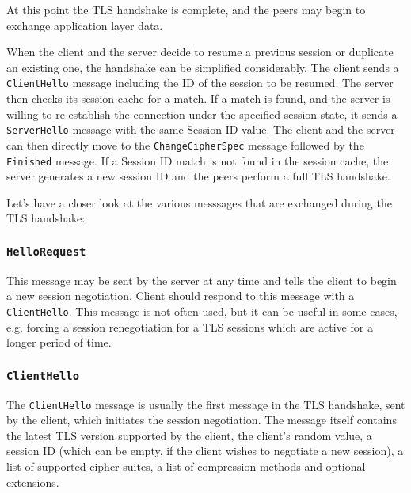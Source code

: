     At this point the TLS handshake is complete, and the peers may begin to
    exchange application layer data.


    When the client and the server decide to resume a previous session or duplicate
    an existing one, the handshake can be simplified considerably. The client
    sends a \texttt{ClientHello} message including the ID of the session to be
    resumed. The server then checks its session cache for a match. If a match
    is found, and the server is willing to re-establish the connection under
    the specified session state, it sends a \texttt{ServerHello} message with
    the same Session ID value. The client and the server can then directly move
    to the \texttt{ChangeCipherSpec} message followed by the \texttt{Finished}
    message. If a Session ID match is not found in the session cache, the
    server generates a new session ID and the peers perform a full TLS handshake.

    Let's have a closer look at the various messsages that are exchanged during
    the TLS handshake:


\subsubsection{\texttt{HelloRequest}}
    This message may be sent by the server at any time and tells the client
    to begin a new session negotiation. Client should respond to this
    message with a \texttt{ClientHello}. This message is not often used, but
    it can be useful in some cases, e.g. forcing a session renegotiation for
    a TLS sessions which are active for a longer period of time.

\subsubsection{\texttt{ClientHello}}
    The \texttt{ClientHello} message is usually the first message in the TLS
    handshake, sent by the client, which initiates the session negotiation.
    The message itself contains the latest TLS version supported by the client,
    the client's random value, a session ID (which can be empty, if the client
    wishes to negotiate a new session), a list of supported cipher suites,
    a list of compression methods and optional extensions.

